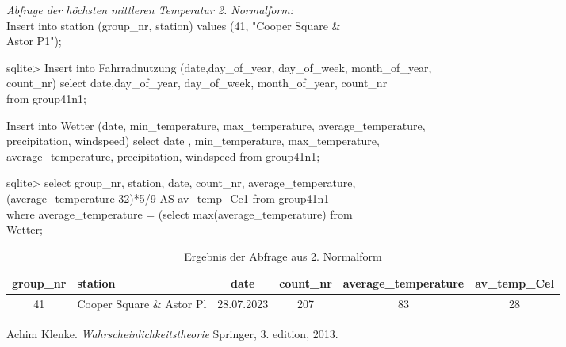 \documentclass{article}
\begin{document}
\textit{Abfrage der höchsten mittleren Temperatur 2. Normalform:} \\ \indent
Insert into station (group\_nr, station) values (41, "Cooper Square \&  \\ \indent Astor P1"); \\ \indent


sqlite> Insert into Fahrradnutzung (date,day\_of\_year, day\_of\_week, month\_of\_year, \\ \indent count\_nr) select date,day\_of\_year, day\_of\_week, month\_of\_year, count\_nr \\ \indent
from group41n1; \\ \indent

Insert into Wetter (date, min\_temperature, max\_temperature, average\_temperature,\\ \indent
precipitation, windspeed) select date , min\_temperature, max\_temperature, \\ \indent 
average\_temperature, precipitation, windspeed from group41n1;\\ \indent

sqlite> select group\_nr, station, date, count\_nr, average\_temperature, \\ \indent 
(average\_temperature-32)*5/9 AS av\_temp\_Ce1 from group41n1 \\ \indent
where average\_temperature = (select max(average\_temperature) from \\ \indent 
Wetter; \\ \indent


\begin{table}[h!]
    \centering
    \begin{tabular}{|c|l|c|c|c|c|}
        \hline
        group\_nr & station & date & count\_nr & average\_temperature & av\_temp\_Cel \\ \hline
        41 & Cooper Square \& Astor Pl & 28.07.2023 & 207 & 83 & 28  \\ \hline
    \end{tabular}
    \caption{Ergebnis der Abfrage aus 2. Normalform }
    \label{tab:wetterdaten}
\end{table}




\newpage

\begin{thebibliography}{9}
Achim Klenke. \textit{Wahrscheinlichkeitstheorie} Springer, 3. edition, 2013.

\end{thebibliography}
\end{document}
